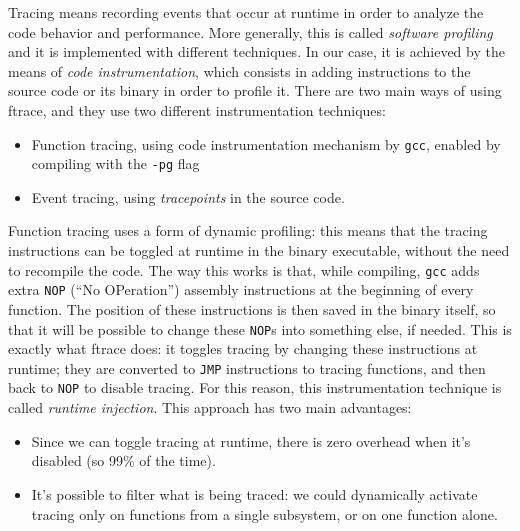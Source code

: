 Tracing means recording events that occur at runtime in order to analyze the code behavior and performance. More generally, this is called \textit{software profiling} and it is implemented with different techniques. In our case, it is achieved by the means of \textit{code instrumentation}, which consists in adding instructions to the source code or its binary in order to profile it. There are two main ways of using ftrace, and they use two different instrumentation techniques:
\begin{itemize}
    \item Function tracing, using code instrumentation mechanism by \verb|gcc|, enabled by compiling with the \verb|-pg| flag
    \item Event tracing, using \textit{tracepoints} in the source code.
\end{itemize}
Function tracing uses a form of dynamic profiling: this means that the tracing instructions can be toggled at runtime in the binary executable, without the need to recompile the code. The way this works is that, while compiling, \verb|gcc| adds extra \verb|NOP| (``No OPeration'') assembly instructions at the beginning of every function. The position of these instructions is then saved in the binary itself, so that it will be possible to change these \verb|NOP|s into something else, if needed. This is exactly what ftrace does: it toggles tracing by changing these instructions at runtime; they are converted to \verb|JMP| instructions to tracing functions, and then back to \verb|NOP| to disable tracing. For this reason, this instrumentation technique is called \textit{runtime injection}. This approach has two main advantages: 
\begin{itemize}
    \item Since we can toggle tracing at runtime, there is zero overhead when it's disabled (so 99\% of the time).
    \item It's possible to filter what is being traced: we could dynamically activate tracing only on functions from a single subsystem, or on one function alone.
\end{itemize}

